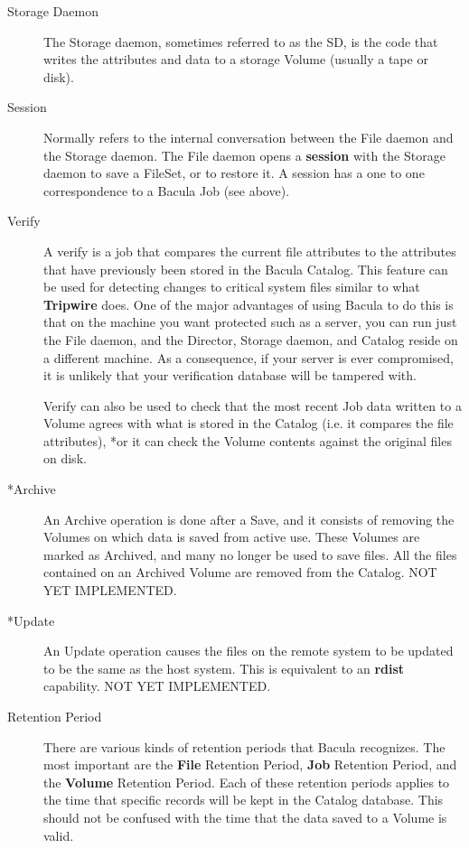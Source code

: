 \begin{description}
\item [Storage Daemon]
   The Storage daemon, sometimes referred to as  the SD, is the code that writes
the attributes and data to a storage  Volume (usually a tape or disk). 

\item [Session]
   Normally refers to the internal conversation between  the File daemon and the
Storage daemon. The File daemon opens a  {\bf session} with the Storage daemon
to save a FileSet, or to restore  it. A session has a one to one
correspondence to a Bacula Job (see  above). 

\item [Verify]
   A verify is a job that compares the current file  attributes to the attributes
that have previously been stored in the  Bacula Catalog. This feature can be
used for detecting changes to  critical system files similar to what {\bf
Tripwire} does. One  of the major advantages of using Bacula to do this is
that  on the machine you want protected such as a server, you can run  just
the File daemon, and the Director, Storage daemon, and Catalog  reside on a
different machine. As a consequence, if your server is  ever compromised, it
is unlikely that your verification database  will be tampered with.  

Verify can also be used to check that the most recent Job  data written to a
Volume agrees with what is stored in the Catalog  (i.e. it compares the file
attributes), *or it can check the  Volume contents against the original files
on disk. 

\item [*Archive]
   An Archive operation is done after a Save, and it  consists of removing the
Volumes on which data is saved from active  use. These Volumes are marked as
Archived, and many no longer be  used to save files. All the files contained
on an Archived Volume  are removed from the Catalog. NOT YET IMPLEMENTED. 

\item [*Update]
   An Update operation causes the files on the remote  system to be updated to be
the same as the host system. This is  equivalent to an {\bf rdist} capability.
NOT YET IMPLEMENTED.  

\item [Retention Period]
   There are various kinds of retention  periods that Bacula recognizes. The most
important are the  {\bf File} Retention Period, {\bf Job} Retention Period,
and the  {\bf Volume} Retention Period. Each of these retention periods 
applies to the time that specific records will be kept in the  Catalog
database. This should not be confused with the time that  the data saved to a
Volume is valid. 


\end{description}

